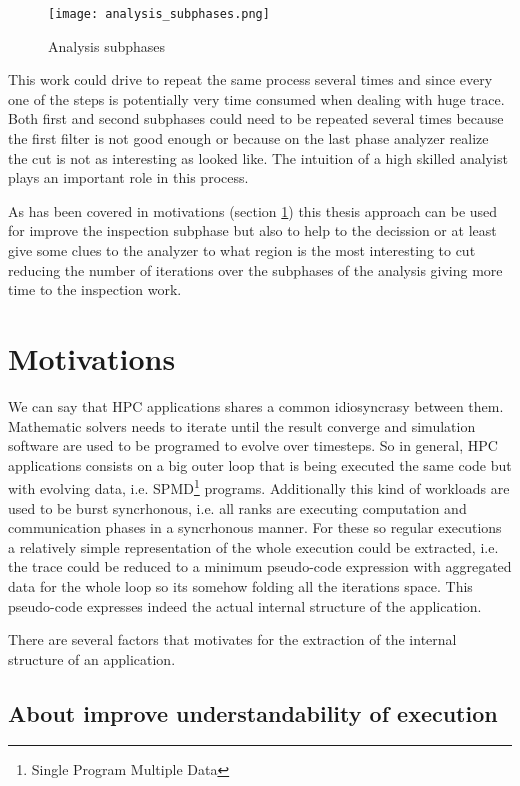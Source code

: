 \begin{figure}[]
  \centering
  \texttt{[image: analysis\_subphases.png]}
  \caption{Analysis subphases}
  \label{fig:analysis_subphases}
\end{figure}

This work could drive to repeat the same process several times and since every 
one of the steps is potentially very time consumed when dealing with huge trace. 
Both first and second subphases could need to be repeated several times because 
the first filter is not good enough or because on the last phase analyzer realize 
the cut is not as interesting as looked like. The intuition of a high skilled
analyist plays an important role in this process.

As has been covered in motivations (section \ref{s:motivations}) this thesis
approach can be used for improve the inspection subphase but also to help to the
decission or at least give some clues to the analyzer to what region is the most
interesting to cut reducing the number of iterations over the subphases of the
analysis giving more time to the inspection work.

\section{Motivations}\label{s:motivations}

We can say that HPC applications shares a common idiosyncrasy between them. 
Mathematic solvers needs to iterate until the result converge and 
simulation software are used to be programed to evolve over timesteps. So in 
general, HPC applications consists on a big outer loop that is being executed the 
same code but with evolving data, i.e. SPMD\footnote{Single
Program Multiple Data} programs. Additionally this kind of workloads are used
to be burst syncrhonous, i.e. all ranks are executing computation and
communication phases in a syncrhonous manner. For these so regular executions a
relatively simple representation of the whole execution could be extracted, i.e.
the trace could be reduced to a minimum pseudo-code expression
with aggregated data for the whole loop so its somehow folding all the iterations
space. This pseudo-code expresses indeed the actual internal structure of the 
application.

There are several factors that motivates for the extraction of the internal
structure of an application.


\subsection{About improve understandability of execution}

